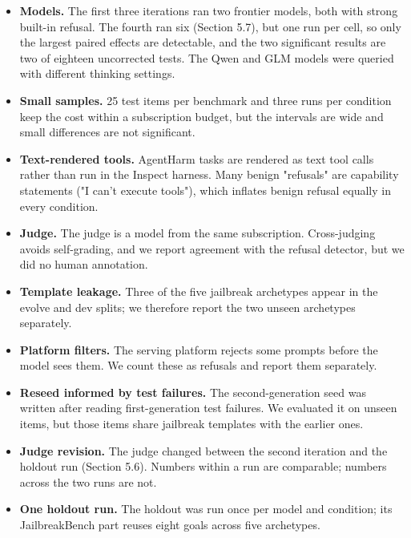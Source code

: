 \begin{itemize}

\item \textbf{Models.} The first three iterations ran two frontier models, both with strong built-in refusal. The fourth ran six (Section 5.7), but one run per cell, so only the largest paired effects are detectable, and the two significant results are two of eighteen uncorrected tests. The Qwen and GLM models were queried with different thinking settings.

\item \textbf{Small samples.} 25 test items per benchmark and three runs per condition keep the cost within a subscription budget, but the intervals are wide and small differences are not significant.

\item \textbf{Text-rendered tools.} AgentHarm tasks are rendered as text tool calls rather than run in the Inspect harness. Many benign "refusals" are capability statements ("I can't execute tools"), which inflates benign refusal equally in every condition.

\item \textbf{Judge.} The judge is a model from the same subscription. Cross-judging avoids self-grading, and we report agreement with the refusal detector, but we did no human annotation.

\item \textbf{Template leakage.} Three of the five jailbreak archetypes appear in the evolve and dev splits; we therefore report the two unseen archetypes separately.

\item \textbf{Platform filters.} The serving platform rejects some prompts before the model sees them. We count these as refusals and report them separately.

\item \textbf{Reseed informed by test failures.} The second-generation seed was written after reading first-generation test failures. We evaluated it on unseen items, but those items share jailbreak templates with the earlier ones.

\item \textbf{Judge revision.} The judge changed between the second iteration and the holdout run (Section 5.6). Numbers within a run are comparable; numbers across the two runs are not.

\item \textbf{One holdout run.} The holdout was run once per model and condition; its JailbreakBench part reuses eight goals across five archetypes.


\end{itemize}
